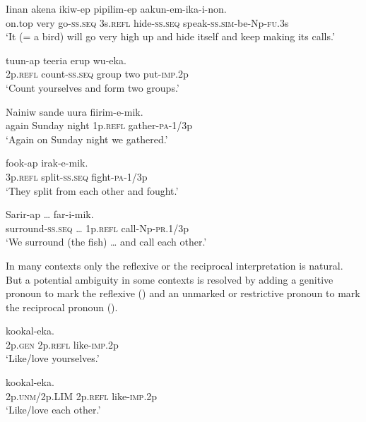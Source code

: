 \ea%
\label{ex:x1864}
\gll Iinan akena ikiw-ep  pipilim-ep aakun-em-ika-i-non.\\
on.top very go-\textsc{ss}.\textsc{seq} 3s.\textsc{refl} hide-\textsc{ss}.\textsc{seq} speak-\textsc{ss}.\textsc{sim}-be-Np-\textsc{fu}.3s\\
\glt`It (= a bird) will go very high up and hide itself and keep making its calls.'
\z

\ea%
\label{ex:x611}
\gll {} tuun-ap teeria erup wu-eka. \\
2p.\textsc{refl} count-\textsc{ss}.\textsc{seq} group two put-\textsc{imp}.2p\\
\glt`Count yourselves and form two groups.'
\z

\ea%
\label{ex:x1865}
\gll Nainiw sande uura  fiirim-e-mik. \\
again Sunday night 1p.\textsc{refl} gather-\textsc{pa}-1/3p\\
\glt`Again on Sunday night we gathered.'
\z

\ea%
\label{ex:x612}
\gll {} fook-ap irak-e-mik. \\
3p.\textsc{refl} split-\textsc{ss}.\textsc{seq} fight-\textsc{pa}-1/3p\\
\glt`They split from each other and fought.'
\z

\ea%
\label{ex:x1866}
\gll Sarir-ap {\dots }  far-i-mik. \\
surround-\textsc{ss}.\textsc{seq} {\dots} 1p.\textsc{refl} call-Np-\textsc{pr}.1/3p\\
\glt`We surround (the fish) {\dots} and call each other.'
\z

In many contexts only the reflexive or the reciprocal interpretation is natural. But a potential ambiguity in some contexts is resolved by adding a genitive pronoun to mark the reflexive () and an unmarked or restrictive pronoun to mark the reciprocal pronoun ().

\ea%
\label{ex:x614}
\gll {}  kookal-eka. \\
2p.\textsc{gen} 2p.\textsc{refl} like-\textsc{imp}.2p\\
\glt`Like/love yourselves.'
\z

\ea%
\label{ex:x613}
\gll {}  kookal-eka. \\
2p.\textsc{unm}/2p.LIM 2p.\textsc{refl} like-\textsc{imp}.2p\\
\glt`Like/love each other.'
\z

